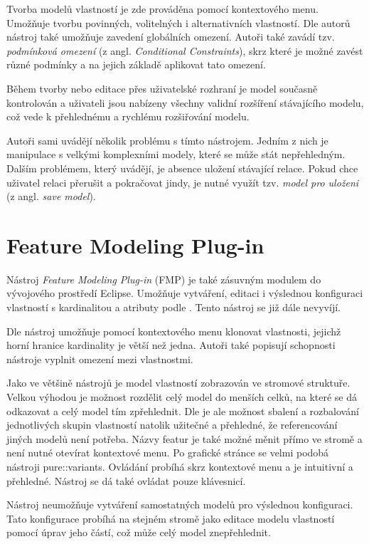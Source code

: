 Tvorba modelů vlastností je zde prováděna pomocí kontextového menu. Umožňuje tvorbu povinných, volitelných i alternativních vlastností. Dle autorů \cite{Pas05} nástroj také umožňuje zavedení globálních omezení. Autoři také zavádí tzv. \textit{podmínková omezení} (z angl. \textit{Conditional Constraints}), skrz které je možné zavést různé podmínky a na jejich základě aplikovat tato omezení. 

Během tvorby nebo editace přes uživatelské rozhraní je model současně kontrolován a uživateli jsou nabízeny všechny validní rozšíření stávajícího modelu, což vede k přehlednému a rychlému rozšiřování modelu.

Autoři \cite{Pas05} sami uvádějí několik problému s tímto nástrojem. Jedním z nich je manipulace s velkými komplexními modely, které se může stát nepřehledným. Dalším problémem, který uvádějí, je absence uložení stávající relace. Pokud chce uživatel relaci přerušit a pokračovat jindy, je nutné využít tzv. \textit{model pro uloženi} (z angl. \textit{save model}).

\section{Feature Modeling Plug-in}
Nástroj \textit{Feature Modeling Plug-in} (FMP) je také zásuvným modulem do vývojového prostředí Eclipse. Umožňuje vytváření, editaci i výslednou konfiguraci vlastností s kardinalitou a atributy podle \cite{Czarneckia05}. Tento nástroj se již dále nevyvíjí.

Dle \cite{Czarneckib05} nástroj umožňuje pomocí kontextového menu klonovat vlastnosti, jejichž horní hranice kardinality je větší než jedna. Autoři \cite{Ant04} také popisují schopnosti nástroje vyplnit omezení mezi vlastnostmi. 

Jako ve většině nástrojů je model vlastností zobrazován ve stromové struktuře. Velkou výhodou je možnost rozdělit celý model do menších celků, na které se dá odkazovat a celý model tím zpřehlednit. Dle \cite{Ant04} je ale možnost sbalení a rozbalování jednotlivých skupin vlastností natolik užitečné a přehledné, že referencování jiných modelů není potřeba. Názvy featur je také možné měnit přímo ve stromě a není nutné otevírat kontextové menu. Po grafické stránce se velmi podobá nástroji pure::variants. Ovládání probíhá skrz kontextové menu a je intuitivní a přehledné. Nástroj se dá také ovládat pouze klávesnicí.  

Nástroj neumožňuje vytváření samostatných modelů pro výslednou konfiguraci. Tato konfigurace probíhá na stejném stromě jako editace modelu vlastností pomocí úprav jeho částí, což může celý model znepřehlednit.

